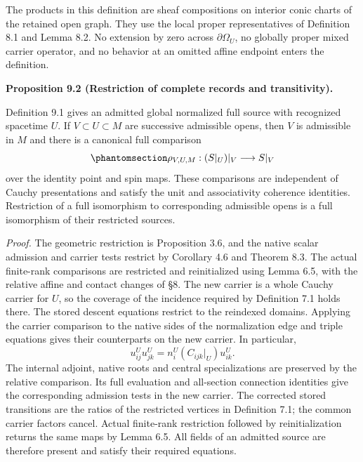 \documentclass[
  english,
  11pt,
  reqno]{amsart}
\makeatletter
\newcommand{\pandocstatementheading}[1]{%
  \par\addpenalty{\@beginparpenalty}%
  \addvspace{.5\baselineskip plus .2\baselineskip minus .2\baselineskip}%
  {\normalfont\bfseries #1\par}%
  \nobreak\@afterindenttrue\@afterheading
}
\makeatother
\begin{document}
The products in this definition are sheaf compositions on interior conic
charts of the retained open graph. They use the local proper
representatives of Definition 8.1 and Lemma 8.2. No extension by zero
across \(\partial\Omega_U\), no globally proper mixed carrier operator,
and no behavior at an omitted affine endpoint enters the definition.

\pandocstatementheading{\protect{}\label{prop:global-open-restriction-coherence}Proposition 9.2 (Restriction of complete records and transitivity).}

Definition 9.1 gives an admitted global normalized full source with
recognized spacetime \(U\). If \(V\subset U\subset M\) are successive
admissible opens, then \(V\) is admissible in \(M\) and there is a
canonical full comparison
\begin{equation}\protect\phantomsection\label{eq:global-open-restriction-transitivity}{
\rho_{V,U,M}:(S|_U)|_V\longrightarrow S|_V
}\end{equation} over the identity point and spin maps. These comparisons
are independent of Cauchy presentations and satisfy the unit and
associativity coherence identities. Restriction of a full isomorphism to
corresponding admissible opens is a full isomorphism of their restricted
sources.

\emph{Proof.} The geometric restriction is Proposition 3.6, and the
native scalar admission and carrier tests restrict by Corollary 4.6 and
Theorem 8.3. The actual finite-rank comparisons are restricted and
reinitialized using Lemma 6.5, with the relative affine and contact
changes of §8. The new carrier is a whole Cauchy carrier for \(U\), so
the coverage of the incidence required by Definition 7.1 holds there.
The stored descent equations restrict to the reindexed domains. Applying
the carrier comparison to the native sides of the normalization edge and
triple equations gives their counterparts on the new carrier. In
particular, \[
u_{ij}^Uu_{jk}^U
=n_i^U(C_{ijk}|_U)u_{ik}^U.
\] The internal adjoint, native roots and central specializations are
preserved by the relative comparison. Its full evaluation and
all-section connection identities give the corresponding admission tests
in the new carrier. The corrected stored transitions are the ratios of
the restricted vertices in Definition 7.1; the common carrier factors
cancel. Actual finite-rank restriction followed by reinitialization
returns the same maps by Lemma 6.5. All fields of an admitted source are
therefore present and satisfy their required equations.
\end{document}
